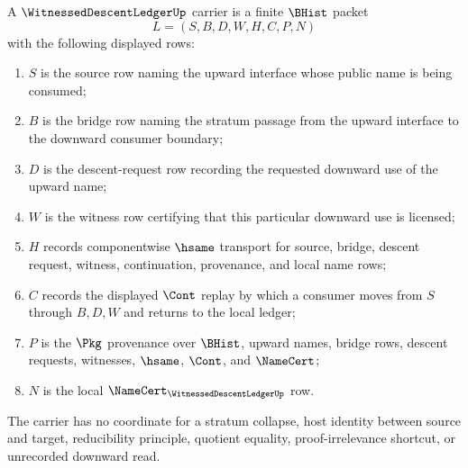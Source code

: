 \begin{definition}
\label{def:witnessed-descent-ledger-carrier}
A $\WitnessedDescentLedgerUp$ carrier is a finite $\BHist$ packet
$$
L=(S,B,D,W,H,C,P,N)
$$
with the following displayed rows:
\begin{enumerate}
\item $S$ is the source row naming the upward interface whose public name is being consumed;
\item $B$ is the bridge row naming the stratum passage from the upward interface to the downward consumer boundary;
\item $D$ is the descent-request row recording the requested downward use of the upward name;
\item $W$ is the witness row certifying that this particular downward use is licensed;
\item $H$ records componentwise $\hsame$ transport for source, bridge, descent request, witness, continuation, provenance, and local name rows;
\item $C$ records the displayed $\Cont$ replay by which a consumer moves from $S$ through $B,D,W$ and returns to the local ledger;
\item $P$ is the $\Pkg$ provenance over $\BHist$, upward names, bridge rows, descent requests, witnesses, $\hsame$, $\Cont$, and $\NameCert$;
\item $N$ is the local $\NameCert_{\WitnessedDescentLedgerUp}$ row.
\end{enumerate}
The carrier has no coordinate for a stratum collapse, host identity between source and target, reducibility principle, quotient equality, proof-irrelevance shortcut, or unrecorded downward read.
\end{definition}

